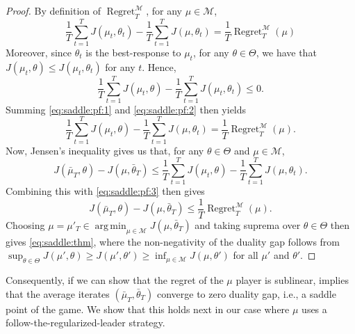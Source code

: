 \documentclass{article} %
\DeclareMathOperator*{\argmin}{arg\,min}
\let\Cref\crtCref
\DeclareMathOperator{\Regret}{Regret}
\begin{document}
\begin{tcolorbox}[ProofFrame]
\begin{proof}
    By definition of $\Regret_T^\mathcal{M}$, for any $\mu \in \mathcal{M}$,
    \begin{equation} \label{eq:saddle:pf:1}
        \frac{1}{T} \sum_{t=1}^T J(\mu_t, \theta_t) - \frac{1}{T} \sum_{t=1}^T J(\mu, \theta_t)
        = \frac{1}{T} \Regret_T^\mathcal{M}(\mu)
    \end{equation}
    Moreover, since $\theta_t$ is the best-response to $\mu_t$, for any $\theta \in \Theta$, we have that $J(\mu_t, \theta) \leq J(\mu_t, \theta_t)$ for any $t$. Hence,
    \begin{equation} \label{eq:saddle:pf:2}
        \frac{1}{T} \sum_{t=1}^T J(\mu_t, \theta) - \frac{1}{T} \sum_{t=1}^T J(\mu_t, \theta_t) \leq 0.
    \end{equation}
    Summing \eqref{eq:saddle:pf:1} and \eqref{eq:saddle:pf:2} then yields
    \begin{equation} \label{eq:saddle:pf:3}
        \frac{1}{T} \sum_{t=1}^T J(\mu_t, \theta) - \frac{1}{T} \sum_{t=1}^T J(\mu, \theta_t) = \frac{1}{T} \Regret_T^\mathcal{M}(\mu).
    \end{equation}
    Now, Jensen's inequality gives us that, for any $\theta \in \Theta$ and $\mu \in \mathcal{M}$,
    \begin{equation}
        J(\bar{\mu}_T, \theta)
        - J(\mu, \bar{\theta}_T)
        \leq
        \frac{1}{T} \sum_{t=1}^T J(\mu_t, \theta)
        - \frac{1}{T} \sum_{t=1}^T J(\mu, \theta_t).
    \end{equation}
    Combining this with \eqref{eq:saddle:pf:3} then gives
    \begin{equation}
        J(\bar{\mu}_T, \theta) - J(\mu, \bar{\theta}_T) \leq \frac{1}{T} \Regret_T^\mathcal{M}(\mu).
    \end{equation}
    Choosing $\mu = \mu'_T \in \argmin_{\mu \in \mathcal{M}} J(\mu, \bar{\theta}_T)$ and taking suprema over $\theta \in \Theta$ then gives \eqref{eq:saddle:thm}, where the non-negativity of the duality gap follows from $\sup_{\theta \in \Theta} J(\mu', \theta) \geq J(\mu', \theta') \geq \inf_{\mu \in \mathcal{M}} J(\mu, \theta')$ for all $\mu'$ and $\theta'$.
\end{proof}
\end{tcolorbox}

Consequently, if we can show that the regret of the $\mu$ player is sublinear, \Cref{thm:saddle_regret} implies that the average iterates $(\bar{\mu}_T, \bar{\theta}_T)$ converge to zero duality gap, i.e., a saddle point of the game.
We show that this holds next in our case where $\mu$ uses a follow-the-regularized-leader strategy. 
\end{document}
